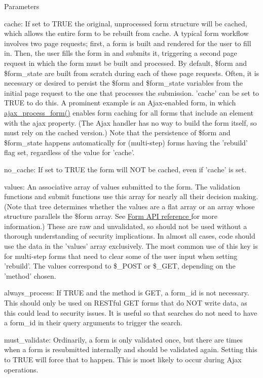 \begin{DoxyParams}{Parameters}
\begin{DoxyItemize}
\item cache: If set to TRUE the original, unprocessed form structure will be cached, which allows the entire form to be rebuilt from cache. A typical form workflow involves two page requests; first, a form is built and rendered for the user to fill in. Then, the user fills the form in and submits it, triggering a second page request in which the form must be built and processed. By default, \$form and \$form\_\-state are built from scratch during each of these page requests. Often, it is necessary or desired to persist the \$form and \$form\_\-state variables from the initial page request to the one that processes the submission. 'cache' can be set to TRUE to do this. A prominent example is an Ajax-\/enabled form, in which \hyperlink{group__ajax_ga41a006b5f6d97e6e56e542f68fbc340d}{ajax\_\-process\_\-form()} enables form caching for all forms that include an element with the ajax property. (The Ajax handler has no way to build the form itself, so must rely on the cached version.) Note that the persistence of \$form and \$form\_\-state happens automatically for (multi-\/step) forms having the 'rebuild' flag set, regardless of the value for 'cache'.
\item no\_\-cache: If set to TRUE the form will NOT be cached, even if 'cache' is set.
\item values: An associative array of values submitted to the form. The validation functions and submit functions use this array for nearly all their decision making. (Note that tree determines whether the values are a flat array or an array whose structure parallels the \$form array. See \hyperlink{}{Form API reference } for more information.) These are raw and unvalidated, so should not be used without a thorough understanding of security implications. In almost all cases, code should use the data in the 'values' array exclusively. The most common use of this key is for multi-\/step forms that need to clear some of the user input when setting 'rebuild'. The values correspond to \$\_\-POST or \$\_\-GET, depending on the 'method' chosen.
\item always\_\-process: If TRUE and the method is GET, a form\_\-id is not necessary. This should only be used on RESTful GET forms that do NOT write data, as this could lead to security issues. It is useful so that searches do not need to have a form\_\-id in their query arguments to trigger the search.
\item must\_\-validate: Ordinarily, a form is only validated once, but there are times when a form is resubmitted internally and should be validated again. Setting this to TRUE will force that to happen. This is most likely to occur during Ajax operations.

\end{DoxyItemize}
\end{DoxyParams}
